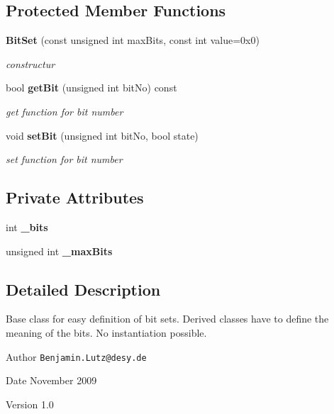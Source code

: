 \subsection*{Protected Member Functions}
\begin{DoxyCompactItemize}
\item 
{\bf BitSet} (const unsigned int maxBits, const int value=0x0)
\begin{DoxyCompactList}\small\item\em constructur \item\end{DoxyCompactList}\item 
bool {\bf getBit} (unsigned int bitNo) const 
\begin{DoxyCompactList}\small\item\em get function for bit number \item\end{DoxyCompactList}\item 
void {\bf setBit} (unsigned int bitNo, bool state)
\begin{DoxyCompactList}\small\item\em set function for bit number \item\end{DoxyCompactList}\end{DoxyCompactItemize}
\subsection*{Private Attributes}
\begin{DoxyCompactItemize}
\item 
int {\bfseries \_\-bits}\label{classCALICE_1_1BitSet_acb489ad5309a1343dc9d368fbfabb4e7}

\item 
unsigned int {\bfseries \_\-maxBits}\label{classCALICE_1_1BitSet_a0105ecaa0c1f03c666f90f3d3b7207c6}

\end{DoxyCompactItemize}


\subsection{Detailed Description}
Base class for easy definition of bit sets. Derived classes have to define the meaning of the bits. No instantiation possible.

\begin{DoxyAuthor}{Author}
{\tt Benjamin.Lutz@desy.de} 
\end{DoxyAuthor}
\begin{DoxyDate}{Date}
November 2009 
\end{DoxyDate}
\begin{DoxyVersion}{Version}
1.0 
\end{DoxyVersion}


